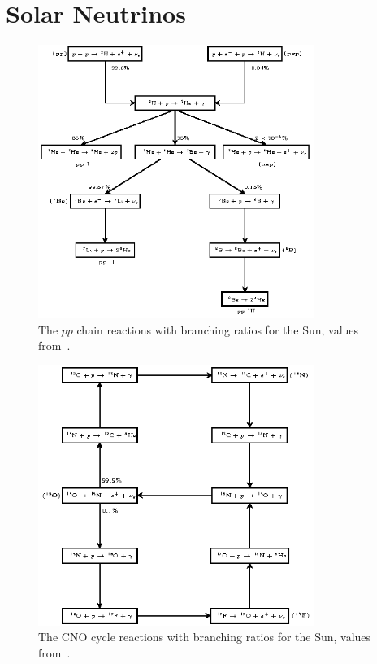 \section{Solar Neutrinos}
\begin{figure}[htbp]
\centering
\includegraphics[width=0.8\textwidth]{pp_chain}
\caption[$pp$ Chain Solar Reactions]{The $pp$ chain reactions with
branching ratios for the Sun, values from~\citep{bahcall_book}.}
\label{fig:pp_chain}
\end{figure}
\begin{figure}[htbp]
\centering
\includegraphics[width=0.8\textwidth]{cno_cycle}
\caption[CNO Cycle Solar Reactions]{The CNO cycle reactions with
branching ratios for the Sun, values from~\citep{bahcall_book}.}
\label{fig:cno_cycle}
\end{figure}
